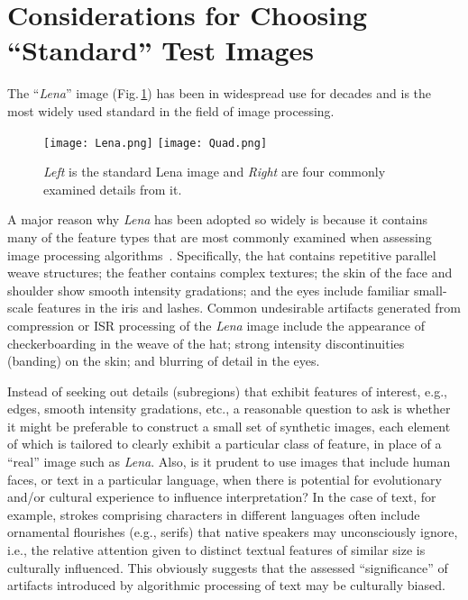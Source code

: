 \documentclass{article}
\begin{document}
\section{Considerations for Choosing ``Standard'' Test Images}

The ``{\em Lena}'' image (Fig.\,\ref{lena}) has been in widespread use for decades 
and is the most widely used standard in the field of image processing.
\begin{figure}
   \centering
   \texttt{[image: Lena.png]}\vspace{3pt} 
   \texttt{[image: Quad.png]}
\caption{{\em Left} is the standard Lena image and {\em Right}
                            are four commonly examined details from it.}
\label{lena}
\end{figure}
A major reason why {\em Lena} has been adopted so widely is because it
contains many of the feature types that are most commonly examined
when assessing image processing algorithms~\cite{Lena}. Specifically, 
the hat contains repetitive parallel weave structures; the feather 
contains complex textures; the skin of the face and shoulder show smooth
intensity gradations; and the eyes include familiar small-scale features
in the iris and lashes. Common undesirable artifacts generated from
compression or ISR processing of the {\em Lena} image include the 
appearance of checkerboarding in the weave of the hat; strong 
intensity discontinuities (banding) on the skin; and blurring of detail 
in the eyes. 

Instead of seeking out details (subregions) that exhibit features of
interest, e.g., edges, smooth intensity gradations, etc., a reasonable
question to ask is whether it might be preferable to construct a
small set of synthetic images, each element of which is tailored to 
clearly exhibit a particular class of feature, in place of a 
``real'' image such as {\em Lena}. Also, is it prudent to use 
images that include human faces, or text in a particular language,
when there is potential for evolutionary and/or cultural experience
to influence interpretation?  In the case of text, for example, 
strokes comprising characters in different languages often include 
ornamental flourishes (e.g., serifs) that native speakers may
unconsciously ignore, i.e., the relative attention given to
distinct textual features of similar size is culturally 
influenced. This obviously suggests that the 
assessed ``significance'' of artifacts introduced by 
algorithmic processing of text may be culturally biased.
\end{document}
